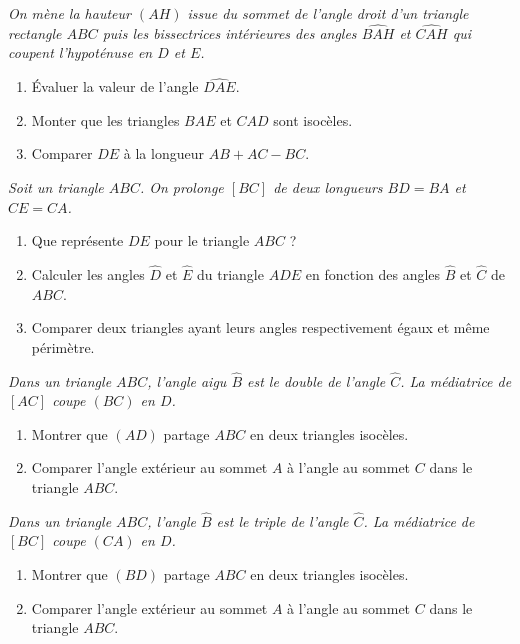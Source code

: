 \begin{itemize}
\begin{enumerate}
\end{enumerate}
\it On mène la hauteur $(AH)$ issue du sommet de l'angle droit d'un triangle rectangle $ABC$ puis les bissectrices intérieures des angles $\widehat{BAH}$ et $\widehat{CAH}$ qui coupent l'hypoténuse en $D$ et $E$. \begin{enumerate}
\item Évaluer la valeur de l'angle $\widehat{DAE}$.
\item Monter que les triangles $BAE$ et $CAD$ sont isocèles.
\item Comparer $DE$ à la longueur $AB+AC-BC$.
\end{enumerate}
\it Soit un triangle $ABC$. On prolonge $[BC]$ de deux longueurs $BD=BA$ et $CE=CA$. 
\begin{enumerate}
\item Que représente $DE$ pour le triangle $ABC$ ? 
\item Calculer les angles $\widehat{D}$ et $\widehat{E}$ du triangle $ADE$ en fonction des angles $\widehat{B}$ et $\widehat{C}$ de $ABC$.
\item Comparer deux triangles ayant leurs angles respectivement égaux et même périmètre. \end{enumerate}
\it Dans un triangle $ABC$, l'angle aigu $\widehat{B}$ est le double de l'angle $\widehat{C}$. La médiatrice de $[AC]$ coupe $(BC)$ en $D$. 
\begin{enumerate}
\item Montrer que $(AD)$ partage $ABC$ en deux triangles isocèles.
\item Comparer l'angle extérieur au sommet $A$ à l'angle au sommet $C$ dans le triangle $ABC$.
\end{enumerate}
\it Dans un triangle $ABC$, l'angle $\widehat{B}$ est le triple de l'angle $\widehat{C}$. La médiatrice de $[BC]$ coupe $(CA)$ en $D$. 
\begin{enumerate}
\item Montrer que $(BD)$ partage $ABC$ en deux triangles isocèles.
\item Comparer l'angle extérieur au sommet $A$ à l'angle au sommet $C$ dans le triangle $ABC$.
\end{enumerate}
\end{itemize}
